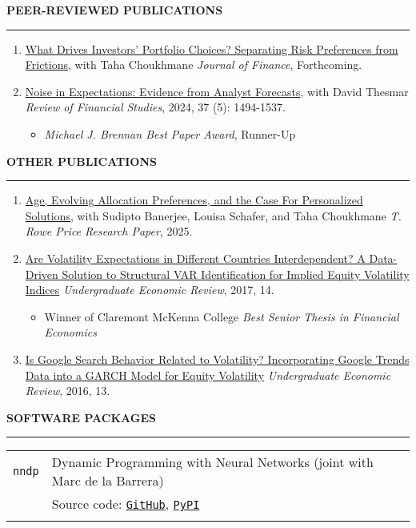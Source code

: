 \documentclass[a4paper, 10pt]{article}
\newcounter{mycounter}
\newcommand{\cvsec}[1]
{
	\needspace{2\baselineskip}
	\noindent \textbf{#1}
	
	\vspace{2pt}
	
	\hrule
	
	\bigskip
}
\newcommand{\cvitem}[2]{#1 & #2 \\ & \\}
\newenvironment{cvchrono}[1]
{
	\cvsec{#1}
	\begin{tabu} to \linewidth {X[1,l]X[6,l]} 
}
{
	\end{tabu}
}
\newenvironment{cvcontinue}[1]
{
	\cvsec{#1}
	\begin{enumerate}
		\setcounter{enumi}{\themycounter}
	}
	{
	\setcounter{mycounter}{\theenumi}
	\end{enumerate}
}
\begin{document}
\begin{cvcontinue}{PEER-REVIEWED PUBLICATIONS}
	\item \href{https://www.timdesilva.me/files/papers/preferences_frictions.pdf}{What Drives Investors' Portfolio Choices? Separating Risk Preferences from Frictions}, with Taha Choukhmane \newline \emph{Journal of Finance}, Forthcoming.
	\item \href{https://www.timdesilva.me/files/papers/noise_expectations.pdf}{Noise in Expectations: Evidence from Analyst Forecasts}, with David Thesmar \newline \emph{Review of Financial Studies}, 2024, 37 (5): 1494-1537.
	\begin{itemize}
		\item \emph{Michael J. Brennan Best Paper Award}, Runner-Up
	\end{itemize}
\end{cvcontinue}

\begin{cvcontinue}{OTHER PUBLICATIONS}
	\item \href{http://timhdesilva.github.io/files/papers/trp_white_paper.pdf}{Age, Evolving Allocation Preferences, and the Case For Personalized Solutions}, with Sudipto Banerjee, Louisa Schafer, and Taha Choukhmane \newline \emph{T. Rowe Price Research Paper}, 2025.
	\item \href{https://digitalcommons.iwu.edu/uer/vol14/iss1/8/}{Are Volatility Expectations in Different Countries Interdependent? A Data-Driven Solution to Structural VAR Identification for Implied Equity Volatility Indices} \newline \emph{Undergraduate Economic Review}, 2017, 14.
	\begin{itemize}
		\item Winner of Claremont McKenna College \emph{Best Senior Thesis in Financial Economics}
	\end{itemize}
	\item \href{https://digitalcommons.iwu.edu/uer/vol13/iss1/13/}{Is Google Search Behavior Related to Volatility? Incorporating Google Trends Data into a GARCH Model for Equity Volatility} \newline \emph{Undergraduate Economic Review}, 2016, 13.\\
\end{cvcontinue}

\begin{cvchrono}{SOFTWARE PACKAGES}
	\cvitem{\texttt{nndp}}{Dynamic Programming with Neural Networks (joint with Marc de la Barrera) \\
	& Source code: \href{https://github.com/marcdelabarrera/nndp}{\texttt{GitHub}}, \href{https://pypi.org/project/nndp/}{\texttt{PyPI}}
	}
\end{cvchrono}
\end{document}
